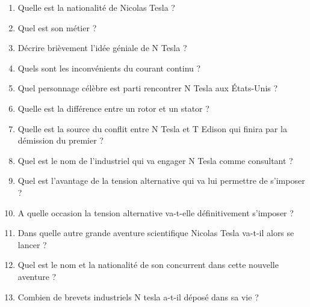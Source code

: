 \documentclass[11pt,a4paper]{article}
\newcommand{\cadreblanc}[1]{%
\medskip\framebox[\linewidth][c]{%
\rule{0mm}{#1mm}}\par
\medskip}
\begin{document}
\begin{enumerate}
 
\item Quelle est la nationalité de Nicolas Tesla ?  

\cadreblanc{10}

\item Quel est son métier ?

\cadreblanc{10}

\item Décrire brièvement l'idée géniale de N Tesla ?

\cadreblanc{15}

\item Quels sont les inconvénients du courant continu ?

\cadreblanc{15}

\item  Quel personnage célèbre est parti rencontrer N Tesla aux États-Unis ?

\cadreblanc{10}

\item Quelle est la différence entre un rotor et un stator ?

\cadreblanc{20}

\item Quelle est la source du conflit entre N Tesla et T Edison qui finira par la démission du premier ?

\cadreblanc{15}

\item Quel est le nom de l'industriel qui va engager N Tesla comme consultant ?

\cadreblanc{10}

\item Quel est l'avantage de la tension alternative qui va lui permettre de s'imposer ?

\cadreblanc{20}

\item A quelle occasion la tension alternative va-t-elle définitivement s'imposer ?

\cadreblanc{10}


\item Dans quelle autre grande aventure scientifique Nicolas Tesla va-t-il alors se lancer ?

\cadreblanc{10}


\item Quel est le nom et la nationalité de son concurrent dans cette nouvelle aventure ?

\cadreblanc{10}


\item Combien de brevets industriels N tesla a-t-il déposé dans sa vie ?

\cadreblanc{15}


\end{enumerate}
\end{document}
